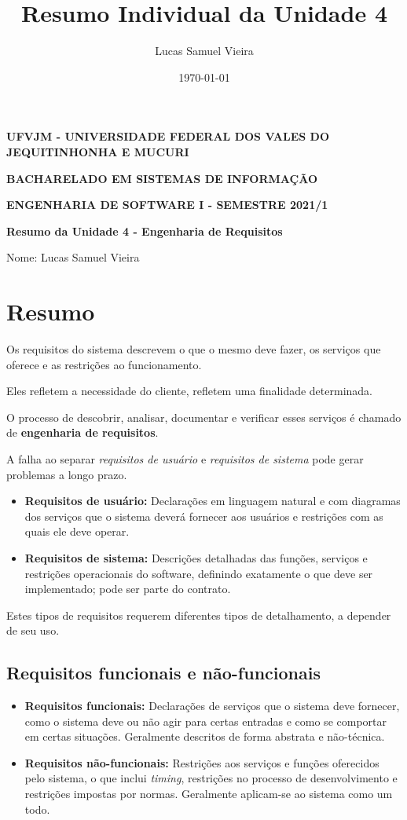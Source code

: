 \documentclass[article, a4paper, oneside, 11pt, english, brazil, sumario=tradicional]{abntex2}
\author{Lucas Samuel Vieira}
\date{\today}
\title{Resumo Individual da Unidade 4}
\begin{document}
\OnehalfSpacing
\pretextual
\textual

\begin{center}
\textbf{UFVJM - UNIVERSIDADE FEDERAL DOS VALES DO JEQUITINHONHA E MUCURI}

\textbf{BACHARELADO EM SISTEMAS DE INFORMAÇÃO}

\textbf{ENGENHARIA DE SOFTWARE I - SEMESTRE 2021/1}

\textbf{Resumo da Unidade 4 - Engenharia de Requisitos}
\end{center}

\noindent
Nome: Lucas Samuel Vieira
\newline

\section{Resumo}
\label{sec:org5c39eab}

Os  requisitos do  sistema  descrevem o  que o  mesmo  deve fazer,  os
serviços que oferece e as restrições ao funcionamento.

Eles  refletem  a  necessidade  do cliente,  refletem  uma  finalidade
determinada.

O  processo  de  descobrir,  analisar, documentar  e  verificar  esses
serviços é chamado de \textbf{engenharia de requisitos}.

A falha ao  separar \emph{requisitos de usuário} e  \emph{requisitos de sistema}
pode gerar problemas a longo prazo.

\begin{itemize}
\item \textbf{Requisitos  de usuário:}  Declarações  em linguagem  natural e  com
diagramas dos serviços que o  sistema deverá fornecer aos usuários e
restrições com as quais ele deve operar.
\item \textbf{Requisitos de sistema:} Descrições detalhadas das funções, serviços
e restrições  operacionais do  software, definindo exatamente  o que
deve ser implementado; pode ser parte do contrato.
\end{itemize}

Estes tipos de requisitos requerem diferentes tipos de detalhamento, a
depender de seu uso.

\subsection{Requisitos funcionais e não-funcionais}
\label{sec:orgaa5817d}

\begin{itemize}
\item \textbf{Requisitos funcionais:} Declarações de  serviços que o sistema deve
fornecer, como  o sistema deve  ou não  agir para certas  entradas e
como se comportar em certas situações. Geralmente descritos de forma
abstrata e não-técnica.
\item \textbf{Requisitos  não-funcionais:}  Restrições  aos  serviços  e  funções
oferecidos  pelo  sistema,  o  que inclui  \emph{timing},  restrições  no
processo    de   desenvolvimento    e   restrições    impostas   por
normas. Geralmente aplicam-se ao sistema como um todo.
\end{itemize}
\end{document}
